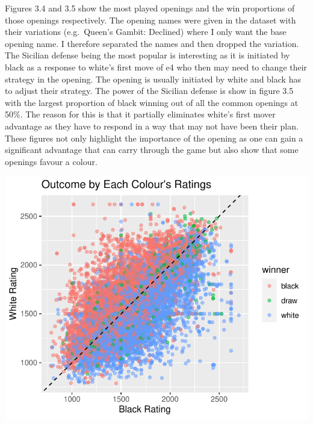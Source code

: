 \documentclass[12pt,preprint, authoryear]{elsarticle}
\let\origfigure\figure
\let\endorigfigure\endfigure
\renewenvironment{figure}[1][2] {
    \expandafter\origfigure\expandafter[H]
} {
    \endorigfigure
}
\numberwithin{equation}{section}
\numberwithin{figure}{section}
\numberwithin{table}{section}
\begin{document}
Figures 3.4 and 3.5 show the most played openings and the win
proportions of those openings respectively. The opening names were given
in the dataset with their variations (e.g.~Queen's Gambit: Declined)
where I only want the base opening name. I therefore separated the names
and then dropped the variation. The Sicilian defense being the most
popular is interesting as it is initiated by black as a response to
white's first move of e4 who then may need to change their strategy in
the opening. The opening is usually initiated by white and black has to
adjust their strategy. The power of the Sicilian defense is show in
figure 3.5 with the largest proportion of black winning out of all the
common openings at 50\%. The reason for this is that it partially
eliminates white's first mover advantage as they have to respond in a
way that may not have been their plan. These figures not only highlight
the importance of the opening as one can gain a significant advantage
that can carry through the game but also show that some openings favour
a colour.

\begin{figure}[H]

{\centering \includegraphics{WriteUp_files/figure-latex/ratingoutcomescatter-1} 

}

\caption{Outcome and Ratings\label{Figure6}}\label{fig:ratingoutcomescatter}
\end{figure}
\end{document}
